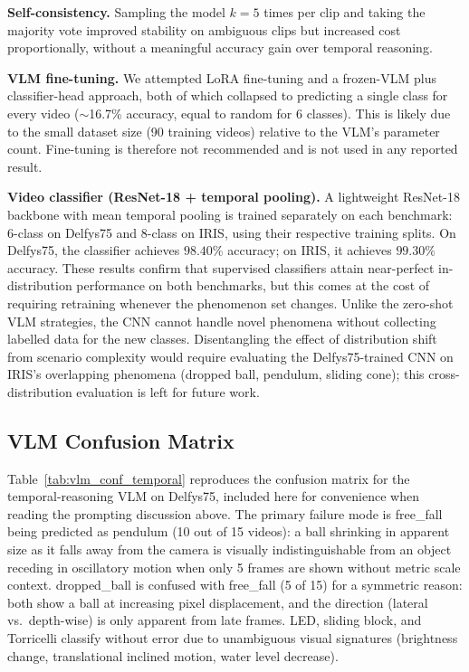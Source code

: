 \documentclass[runningheads]{llncs}
\begin{document}
\textbf{Self-consistency.} Sampling the model $k = 5$ times per clip and
taking the majority vote improved stability on ambiguous clips but increased
cost proportionally, without a meaningful accuracy gain over temporal reasoning.

\textbf{VLM fine-tuning.} We attempted LoRA fine-tuning and a frozen-VLM
plus classifier-head approach, both of which collapsed to predicting a single
class for every video ($\sim$16.7\% accuracy, equal to random for 6 classes).
This is likely due to the small dataset size (90 training videos) relative
to the VLM's parameter count.  Fine-tuning is therefore not recommended
and is not used in any reported result.

\textbf{Video classifier (ResNet-18 + temporal pooling).} A lightweight
ResNet-18 backbone with mean temporal pooling is trained separately on each benchmark: 6-class on Delfys75 and 8-class on IRIS, using their respective training splits. On Delfys75, the classifier achieves $98.40\%$ accuracy; on IRIS, it achieves $99.30\%$ accuracy. These results confirm that supervised classifiers attain near-perfect in-distribution performance on both benchmarks, but this comes at the cost of requiring retraining whenever the phenomenon set changes. Unlike the zero-shot VLM strategies, the CNN cannot handle novel phenomena without collecting labelled data for the new classes. Disentangling the effect of distribution shift from scenario complexity would require evaluating the Delfys75-trained CNN on IRIS's overlapping phenomena (dropped ball, pendulum, sliding cone); this cross-distribution evaluation is left for future work.

\subsection{VLM Confusion Matrix}
\label{app:vlm_confusion}

Table~\ref{tab:vlm_conf_temporal} reproduces the confusion matrix for the
temporal-reasoning VLM on Delfys75, included here for convenience when
reading the prompting discussion above.
The primary failure mode is free\_fall being predicted as pendulum
(10 out of 15 videos): a ball shrinking in apparent size as it falls away
from the camera is visually indistinguishable from an object receding in
oscillatory motion when only 5 frames are shown without metric scale context.
dropped\_ball is confused with free\_fall (5 of 15) for a symmetric reason:
both show a ball at increasing pixel displacement, and the direction
(lateral vs.\ depth-wise) is only apparent from late frames.
LED, sliding block, and Torricelli classify without error due to
unambiguous visual signatures (brightness change, translational inclined
motion, water level decrease).
\end{document}
